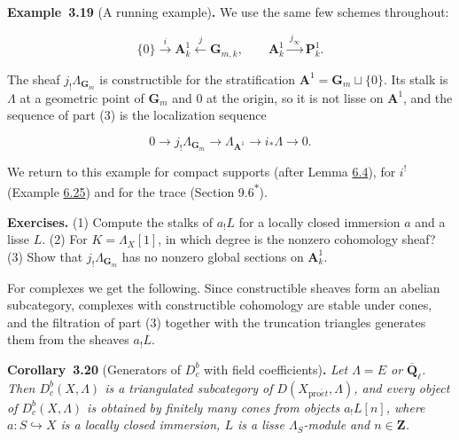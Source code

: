 \documentclass[11pt]{article}
\newenvironment{bpstatement}[2]{\par\addvspace{0.6\baselineskip}\noindent\textbf{#1}#2\textbf{.}\enspace\ignorespaces}
  {\par\addvspace{0.4\baselineskip}}
\newenvironment{bpstatementit}[2]{\begin{bpstatement}{#1}{#2}\itshape\ignorespaces}{\end{bpstatement}}
\newcommand{\bpout}[1]{#1\textsuperscript{\hyperlink{bp-outside}{\ensuremath{\ast}}}}
\providecommand{\Dbc}{}\renewcommand{\Dbc}{D^b_c}
\begin{document}
\label{bp251}%
\begin{bpstatement}{Example~3.19}{ (A running example)}
We use the same few schemes throughout:

\[
\{0\}\xrightarrow{\ i\ }\mathbf A^1_k\xleftarrow{\ j\ }\mathbf G_{m,k},
\qquad \mathbf A^1_k\xrightarrow{\ j_\infty\ }\mathbf P^1_k .
\]

The sheaf \(j_!\Lambda_{\mathbf G_m}\) is constructible for the stratification \(\mathbf A^1=\mathbf G_m\sqcup\{0\}\). Its stalk is \(\Lambda\) at a geometric point of \(\mathbf G_m\) and \(0\) at the origin, so it is not lisse on \(\mathbf A^1\), and the sequence of part (3) is the localization sequence

\[
0\to j_!\Lambda_{\mathbf G_m}\to\Lambda_{\mathbf A^1}\to i_*\Lambda\to0 .
\]

We return to this example for compact supports (after Lemma \hyperref[bp526]{6.4}), for \(i^!\) (Example \hyperref[bp591]{6.25}) and for the trace (Section \bpout{9.6}).
\end{bpstatement}

\label{bp252}%
\textbf{Exercises.} (1) Compute the stalks of \(a_!L\) for a locally closed immersion \(a\) and a lisse \(L\). (2) For \(K=\Lambda_X[1]\), in which degree is the nonzero cohomology sheaf? (3) Show that \(j_!\Lambda_{\mathbf G_m}\) has no nonzero global sections on \(\mathbf A^1_k\).

For complexes we get the following. Since constructible sheaves form an abelian subcategory, complexes with constructible cohomology are stable under cones, and the filtration of part (3) together with the truncation triangles generates them from the sheaves \(a_!L\).

\label{bp253}%
\begin{bpstatementit}{Corollary~3.20}{ (Generators of $D^b_c$ with field coefficients)}
Let \(\Lambda=E\) or \(\overline{\mathbf Q}_\ell\). Then \(\Dbc(X,\Lambda)\) is a triangulated subcategory of \(D(X_{\mathrm{pro}\acute{e}t},\Lambda)\), and every object of \(\Dbc(X,\Lambda)\) is obtained by finitely many cones from objects \(a_!L[n]\), where \(a:S\hookrightarrow X\) is a locally closed immersion, \(L\) is a lisse \(\Lambda_S\)-module and \(n\in\mathbf Z\).
\end{bpstatementit}
\end{document}
